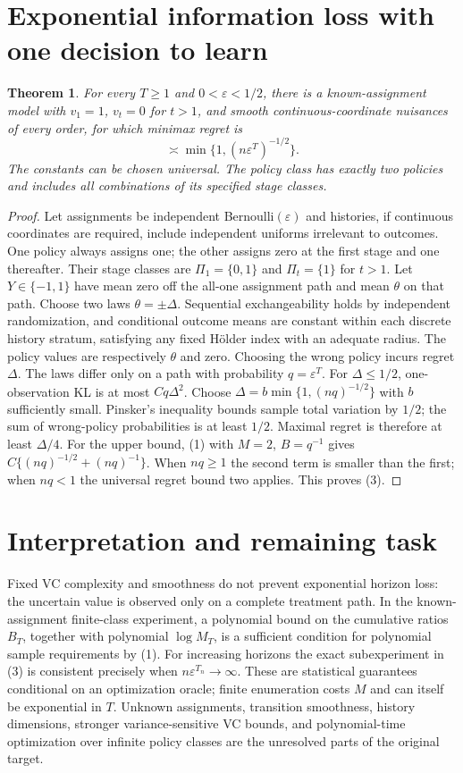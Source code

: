 \documentclass[11pt]{article}
\newtheorem{theorem}{Theorem}
\theoremstyle{definition}
\begin{document}
\section*{Exponential information loss with one decision to learn}
\begin{theorem}
For every $T\ge1$ and $0<\varepsilon<1/2$, there is a known-assignment
model with $v_1=1$, $v_t=0$ for $t>1$, and smooth continuous-coordinate
nuisances of every order, for which minimax regret is
\[
 \asymp\min\{1,(n\varepsilon^T)^{-1/2}\}.               \tag{3}
\]
The constants can be chosen universal. The policy class has exactly two
policies and includes all combinations of its specified stage classes.
\end{theorem}
\begin{proof}
Let assignments be independent Bernoulli$(\varepsilon)$ and histories,
if continuous coordinates are required, include independent uniforms
irrelevant to outcomes. One policy always assigns one; the other assigns
zero at the first stage and one thereafter. Their stage classes are
$\Pi_1=\{0,1\}$ and $\Pi_t=\{1\}$ for $t>1$.
Let $Y\in\{-1,1\}$ have mean zero off the all-one assignment path and
mean $\theta$ on that path. Choose two laws $\theta=\pm\Delta$.
Sequential exchangeability holds by independent randomization, and
conditional outcome means are constant within each discrete history
stratum, satisfying any fixed H\"older index with an adequate radius.
The policy values are respectively $\theta$ and zero. Choosing the wrong
policy incurs regret $\Delta$.
The laws differ only on a path with probability $q=\varepsilon^T$.
For $\Delta\le1/2$, one-observation KL is at most $Cq\Delta^2$.
Choose $\Delta=b\min\{1,(nq)^{-1/2}\}$ with $b$ sufficiently small.
Pinsker's inequality bounds sample total variation by $1/2$; the sum of
wrong-policy probabilities is at least $1/2$. Maximal regret is therefore
at least $\Delta/4$.
For the upper bound, (1) with $M=2$, $B=q^{-1}$ gives
$C\{(nq)^{-1/2}+(nq)^{-1}\}$. When $nq\ge1$ the second term is smaller
than the first; when $nq<1$ the universal regret bound two applies.
This proves (3).
\end{proof}

\section*{Interpretation and remaining task}
Fixed VC complexity and smoothness do not prevent exponential horizon
loss: the uncertain value is observed only on a complete treatment path.
In the known-assignment finite-class experiment, a polynomial bound on
the cumulative ratios $B_T$, together with polynomial $\log M_T$,
is a sufficient condition for polynomial sample requirements by (1).
For increasing horizons the exact subexperiment in (3) is consistent
precisely when $n\varepsilon^{T_n}\to\infty$.
These are statistical guarantees conditional on an optimization oracle;
finite enumeration costs $M$ and can itself be exponential in $T$.
Unknown assignments, transition smoothness, history dimensions, stronger
variance-sensitive VC bounds, and polynomial-time optimization over
infinite policy classes are the unresolved parts of the original target.
\end{document}
